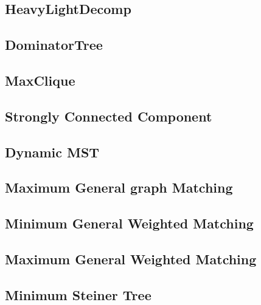 \documentclass[a4paper,10pt,twocolumn,oneside]{article}
\begin{document}
\subsection{HeavyLightDecomp}


\subsection{DominatorTree}


\subsection{MaxClique}
% 


%

\subsection{Strongly Connected Component}


\subsection{Dynamic MST}


\subsection{Maximum General graph Matching}


\subsection{Minimum General Weighted Matching}


\subsection{Maximum General Weighted Matching}


\subsection{Minimum Steiner Tree}

\end{document}
